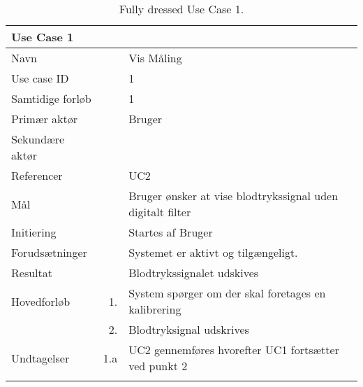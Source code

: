 \begin{longtabu} to  %
    {\large \textbf{Use Case 1}} && \\
    \toprule
    Navn &&    Vis Måling\\
    Use case ID &&    1\\
    Samtidige forløb &&    1\\
    Primær aktør &&    Bruger\\
    Sekundære aktør &&	 \\
    Referencer &&    UC2 \\
    Mål &&    Bruger ønsker at vise blodtrykssignal uden digitalt filter\\
    Initiering &&	Startes af Bruger\\
    Forudsætninger &&  Systemet er aktivt og tilgængeligt.\\
    Resultat &&		Blodtrykssignalet udskives                         \\ \midrule
    Hovedforløb &    1. &    System spørger om der skal foretages en kalibrering\\								
    			&    2. &    Blodtryksignal udskrives\newline\\ \midrule
                
    Undtagelser &    1.a &   UC2 gennemføres hvorefter UC1 fortsætter ved punkt 2   \\ \bottomrule
\caption{Fully dressed Use Case 1.}
\label{UC1}
\end{longtabu}


